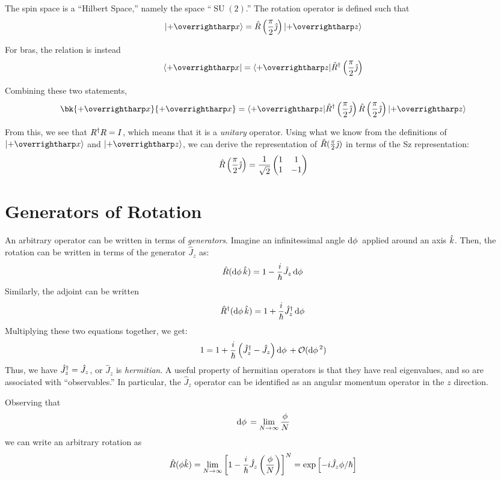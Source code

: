 The spin space is a ``Hilbert Space,'' namely the space ``\(\operatorname{SU}(2)\).'' The rotation operator is defined such that
\[\k{+\vv x}=\hat R\left(\frac{\pi}{2}\jh\right) \k{+\vv z}\]

For bras, the relation is instead
\[\b{+\vv x} = \b{+\vv z}\hat R \adj\left(\frac{\pi}{2}\jh\right)\]

Combining these two statements,
\[\bk{+\vv x}{+\vv x}=\b{+\vv z}\hat R\adj\left(\frac{\pi}{2}\jh\right)\hat R \left(\frac{\pi}{2}\jh\right) \k{+\vv z}\]

From this, we see that \(R^{\dagger} R = I\), which means that it is a \emph{unitary} operator. Using what we know from the definitions of \(\k{+\vv x}\) and \(\k{+\vv z}\), we can derive the representation of \(\hat R (\frac{\pi}{2}\hat{\jmath})\) in terms of the Sz representation:
\[\hat R\left(\frac{\pi}{2}\hat{\jmath}\right)=\frac{1}{\sqrt{2}}\begin{pmatrix}1&1\\1&-1\end{pmatrix}\]

\section{Generators of Rotation}
An arbitrary operator can be written in terms of \emph{generators}. Imagine an infinitessimal angle \(\d\f\) applied around an axis \(\hat{k}\). Then, the rotation can be written in terms of the generator \(\hat{J}_z\) as:
\[\hat R (\d\f \kh)=1-\frac{i}{\hbar}\hat{J}_z\d\f\]
Similarly, the adjoint can be written
\[\hat R\adj (\d\f \kh)=1+\frac{i}{\hbar}\hat{J}_z\adj\d\f\]
Multiplying these two equations together, we get:
\[1=1+\frac{i}{\hbar} \left( \hat{J}_z\adj-\hat{J}_z \right)\d\f + \mathcal{O}(\d\phi^2)\]
Thus, we have \(\hat{J}_z^{\dagger}=\hat{J}_z\), or \(\hat{J}_z\) is \emph{hermitian}. A useful property of hermitian operators is that they have real eigenvalues, and so are associated with ``observables.'' In particular, the \(\hat{J}_z\) operator can be identified as an angular momentum operator in the \(z\) direction.

Observing that 
\[\d\f = \lim_{N\to\infty}\frac{\phi}{N}\]
we can write an arbitrary rotation as
\begin{equation}
	\hat R (\phi \hat{k})=\lim_{N\rightarrow\infty}\left[1-\frac{i}{\hbar}\hat{J}_z\left(\frac{\phi}{N}\right)\right]^N = \exp\left[-i\hat{J}_z\phi/\hbar\right]\label{eq2:rotgen}
\end{equation}

